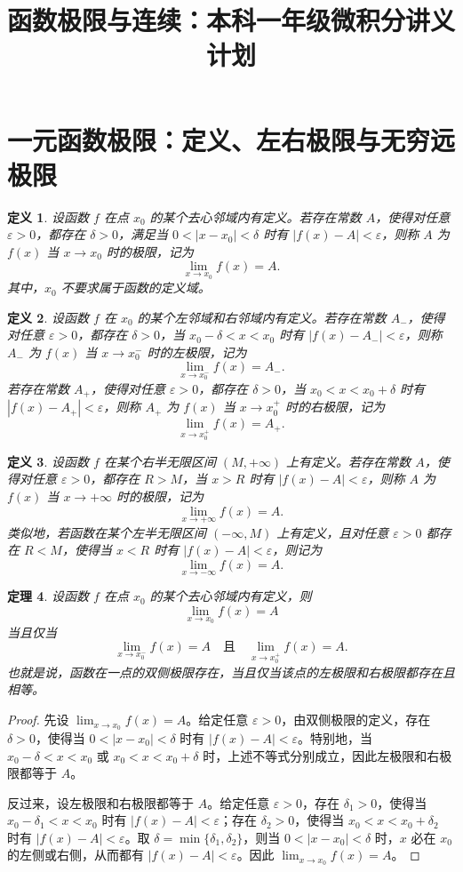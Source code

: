 \documentclass[UTF8,fontset=fandol,11pt]{ctexart}
\title{函数极限与连续：本科一年级微积分讲义计划}
\date{}
\newtheorem{definition}{定义}[section]
\newtheorem{theorem}[definition]{定理}
\begin{document}
\maketitle
\section{一元函数极限：定义、左右极限与无穷远极限}\label{sec:S01}
\begin{definition}
设函数 $f$ 在点 $x_0$ 的某个去心邻域内有定义。若存在常数 $A$，使得对任意 $\varepsilon>0$，都存在 $\delta>0$，满足当 $0<|x-x_0|<\delta$ 时有 $|f(x)-A|<\varepsilon$，则称 $A$ 为 $f(x)$ 当 $x\to x_0$ 时的极限，记为
\[
\lim_{x\to x_0}f(x)=A.
\]
其中，$x_0$ 不要求属于函数的定义域。\label{def:point-limit}
\end{definition}
\begin{definition}
设函数 $f$ 在 $x_0$ 的某个左邻域和右邻域内有定义。若存在常数 $A_-$，使得对任意 $\varepsilon>0$，都存在 $\delta>0$，当 $x_0-\delta<x<x_0$ 时有 $|f(x)-A_-|<\varepsilon$，则称 $A_-$ 为 $f(x)$ 当 $x\to x_0^-$ 时的左极限，记为
\[
\lim_{x\to x_0^-}f(x)=A_-.
\]
若存在常数 $A_+$，使得对任意 $\varepsilon>0$，都存在 $\delta>0$，当 $x_0<x<x_0+\delta$ 时有 $|f(x)-A_+|<\varepsilon$，则称 $A_+$ 为 $f(x)$ 当 $x\to x_0^+$ 时的右极限，记为
\[
\lim_{x\to x_0^+}f(x)=A_+.
\]
\label{def:one-sided-limit}
\end{definition}
\begin{definition}
设函数 $f$ 在某个右半无限区间 $(M,+\infty)$ 上有定义。若存在常数 $A$，使得对任意 $\varepsilon>0$，都存在 $R>M$，当 $x>R$ 时有 $|f(x)-A|<\varepsilon$，则称 $A$ 为 $f(x)$ 当 $x\to+\infty$ 时的极限，记为
\[
\lim_{x\to+\infty}f(x)=A.
\]
类似地，若函数在某个左半无限区间 $(-\infty,M)$ 上有定义，且对任意 $\varepsilon>0$ 都存在 $R<M$，使得当 $x<R$ 时有 $|f(x)-A|<\varepsilon$，则记为
\[
\lim_{x\to-\infty}f(x)=A.
\]
\label{def:infinite-limit}
\end{definition}
\begin{theorem}
设函数 $f$ 在点 $x_0$ 的某个去心邻域内有定义，则
\[
\lim_{x\to x_0}f(x)=A
\]
当且仅当
\[
\lim_{x\to x_0^-}f(x)=A
\quad\text{且}\quad
\lim_{x\to x_0^+}f(x)=A.
\]
也就是说，函数在一点的双侧极限存在，当且仅当该点的左极限和右极限都存在且相等。\label{thm:two-sided-limit-criterion}
\end{theorem}
\begin{proof}
先设 $\lim_{x\to x_0}f(x)=A$。给定任意 $\varepsilon>0$，由双侧极限的定义，存在 $\delta>0$，使得当 $0<|x-x_0|<\delta$ 时有 $|f(x)-A|<\varepsilon$。特别地，当 $x_0-\delta<x<x_0$ 或 $x_0<x<x_0+\delta$ 时，上述不等式分别成立，因此左极限和右极限都等于 $A$。

反过来，设左极限和右极限都等于 $A$。给定任意 $\varepsilon>0$，存在 $\delta_1>0$，使得当 $x_0-\delta_1<x<x_0$ 时有 $|f(x)-A|<\varepsilon$；存在 $\delta_2>0$，使得当 $x_0<x<x_0+\delta_2$ 时有 $|f(x)-A|<\varepsilon$。取 $\delta=\min\{\delta_1,\delta_2\}$，则当 $0<|x-x_0|<\delta$ 时，$x$ 必在 $x_0$ 的左侧或右侧，从而都有 $|f(x)-A|<\varepsilon$。因此 $\lim_{x\to x_0}f(x)=A$。
\end{proof}
\end{document}
